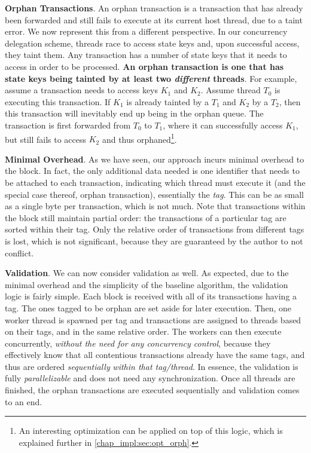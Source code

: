 \textbf{Orphan Transactions}. An orphan transaction is a transaction that has already been
forwarded and still fails to execute at its current host thread, due to a taint error. We now
represent this from a different perspective. In our concurrency delegation scheme, threads race to
access state keys and, upon successful access, they taint them. Any transaction has a number of state
keys that it needs to access in order to be processed. \textbf{An orphan transaction is one that has
state keys being tainted by at least two \textit{different} threads}. For example, assume a
transaction needs to access keys $K_{1}$ and $K_{2}$. Assume thread $T_{0}$ is executing this
transaction. If $K_{1}$ is already tainted by a $T_{1}$ and $K_{2}$ by a $T_{2}$, then this
transaction will inevitably end up being in the orphan queue. The transaction is first forwarded
from $T_{0}$ to $T_{1}$, where it can successfully access $K_{1}$, but still fails to access
$K_{2}$ and thus orphaned\footnote{An interesting optimization can be applied on top of this logic,
which is explained further in \ref{chap_impl:sec:opt_orph}.}.

\textbf{Minimal Overhead}. As we have seen, our approach incurs minimal overhead to the block. In
fact, the only additional data needed is one identifier that needs to be attached to each
transaction, indicating which thread must execute it (and the special case thereof, orphan
transaction), essentially the \textit{tag}. This can be as small as a single byte per transaction,
which is not much. Note that transactions within the block still maintain partial order: the
transactions of a particular tag are sorted within their tag. Only the relative order of
transactions from different tags is lost, which is not significant, because they are guaranteed by
the author to not conflict.

\textbf{Validation}. We can now consider validation as well. As expected, due to the minimal
overhead and the simplicity of the baseline algorithm, the validation logic is fairly simple. Each
block is received with all of its transactions having a tag. The ones tagged to be orphan are set
aside for later execution. Then, one worker thread is spawned per tag and transactions are assigned
to threads based on their tags, and in the same relative order. The workers can then execute
concurrently, \textit{without the need for any concurrency control}, because they effectively know
that all contentious transactions already have the same tags, and thus are ordered
\textit{sequentially} \textit{within that tag/thread}. In essence, the validation is fully
\textit{parallelizable} and does not need any synchronization. Once all threads are finished, the
orphan transactions are executed sequentially and validation comes to an end.

